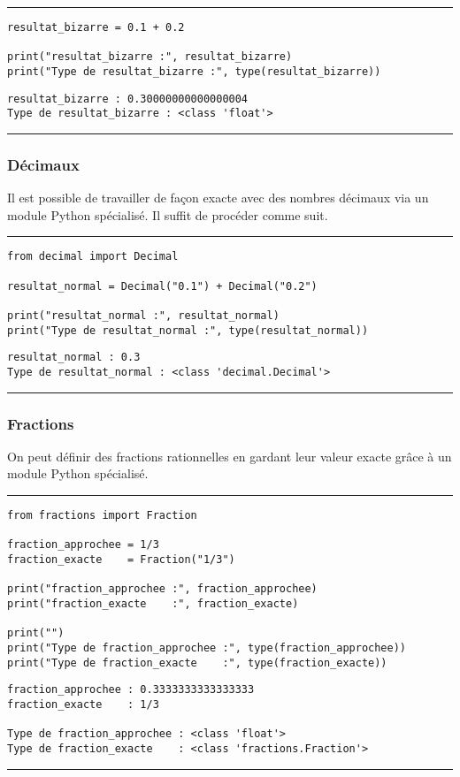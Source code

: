 \bigskip
{\hrule height .5mm}
\begin{verbatim}
resultat_bizarre = 0.1 + 0.2

print("resultat_bizarre :", resultat_bizarre)
print("Type de resultat_bizarre :", type(resultat_bizarre))
\end{verbatim}
 \color{ForestGreen}
\vspace{-1.5em}
\begin{verbatim}
resultat_bizarre : 0.30000000000000004
Type de resultat_bizarre : <class 'float'>
\end{verbatim} \color{Black}
{\hrule height .5mm}
\bigskip


\subsubsection{Décimaux}

Il est possible de travailler de façon exacte avec des nombres décimaux via un module Python spécialisé. Il suffit de procéder comme suit.


\bigskip
{\hrule height .5mm}
\begin{verbatim}
from decimal import Decimal

resultat_normal = Decimal("0.1") + Decimal("0.2")

print("resultat_normal :", resultat_normal)
print("Type de resultat_normal :", type(resultat_normal))
\end{verbatim}
 \color{ForestGreen}
\vspace{-1.5em}
\begin{verbatim}
resultat_normal : 0.3
Type de resultat_normal : <class 'decimal.Decimal'>
\end{verbatim} \color{Black}
{\hrule height .5mm}
\bigskip


\subsubsection{Fractions}

On peut définir des fractions rationnelles en gardant leur valeur exacte grâce à un module Python spécialisé.


\bigskip
{\hrule height .5mm}
\begin{verbatim}
from fractions import Fraction

fraction_approchee = 1/3
fraction_exacte    = Fraction("1/3")

print("fraction_approchee :", fraction_approchee)
print("fraction_exacte    :", fraction_exacte)

print("")
print("Type de fraction_approchee :", type(fraction_approchee))
print("Type de fraction_exacte    :", type(fraction_exacte))
\end{verbatim}
 \color{ForestGreen}
\vspace{-1.5em}
\begin{verbatim}
fraction_approchee : 0.3333333333333333
fraction_exacte    : 1/3

Type de fraction_approchee : <class 'float'>
Type de fraction_exacte    : <class 'fractions.Fraction'>
\end{verbatim} \color{Black}
{\hrule height .5mm}
\bigskip


